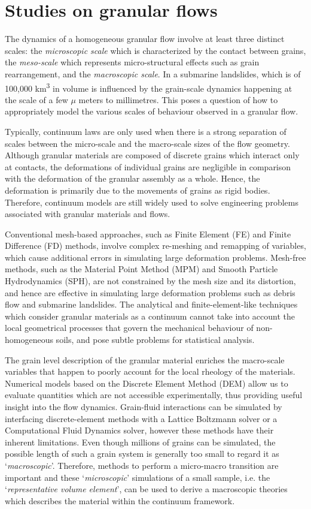 \section{Studies on granular flows}

The dynamics of a homogeneous granular flow involve at least three distinct 
scales: the \textit{microscopic scale} which is characterized by the contact 
between grains, the \textit{meso-scale} which represents micro-structural 
effects such as grain rearrangement, and the \textit{macroscopic scale}. In a 
submarine landslides, which is of 100,000 \si{\km\cubed} in volume is 
influenced by the grain-scale dynamics happening at the scale of 
a few $\mu$ meters to millimetres. This poses a question of how to 
appropriately model the various scales of behaviour observed in a granular 
flow. 

Typically, continuum laws are only used when there is a strong separation of 
scales between the micro-scale and the macro-scale sizes of the flow geometry. 
Although granular materials are composed of discrete grains which interact only 
at contacts, the deformations of individual grains are negligible in comparison 
with the deformation of the granular assembly as a whole. Hence, the 
deformation is primarily due to the movements of grains as rigid bodies. 
Therefore, continuum models are still widely used to solve engineering problems 
associated with granular materials and flows. 

Conventional mesh-based approaches, such as Finite Element (FE) and Finite 
Difference (FD) methods, involve complex re-meshing and remapping of variables, 
which cause additional errors in simulating large deformation problems. 
Mesh-free methods, such as the Material Point Method (MPM) and Smooth Particle 
Hydrodynamics (SPH), are not constrained by the mesh size and its distortion, 
and hence are effective in simulating large deformation problems such as debris 
flow and submarine landslides. The analytical and finite-element-like 
techniques which consider granular materials as a continuum cannot take into 
account the local geometrical processes that govern the mechanical behaviour of 
non-homogeneous soils, and pose subtle problems for statistical analysis. 

The grain level description of the granular material enriches the 
macro-scale variables that happen to poorly account for the local rheology of 
the materials. Numerical models based on the Discrete Element Method (DEM) 
allow us to evaluate quantities which are not accessible experimentally, thus 
providing useful insight into the flow dynamics. Grain-fluid interactions can 
be simulated by interfacing discrete-element methods with a Lattice 
Boltzmann solver or a Computational Fluid Dynamics solver, however these 
methods have their inherent limitations. Even though millions of grains can be 
simulated, the possible length of such a grain system is generally too small to 
regard it as `\textit{macroscopic}'. Therefore, methods to perform a 
micro-macro transition are important and these `\textit{microscopic}' 
simulations of a small sample, i.e. the `\textit{representative volume 
element}', can be used to derive a macroscopic theories which describes the 
material within the continuum framework. 

